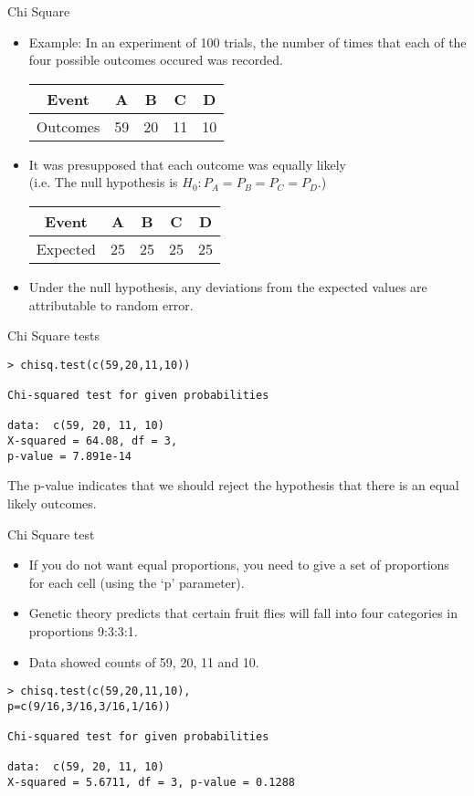 {Chi Square}
\begin{itemize}
	\item Example: In an experiment of 100 trials, the number of times that each of the four possible outcomes
	occured was recorded.\\
	\begin{tabular}{|c|c|c|c|c|}
		\hline
		Event & A & B & C & D \\\hline
		Outcomes & 59 & 20 & 11 & 10 \\
		\hline
	\end{tabular}
	
	\item It was presupposed that each outcome was equally likely \\(i.e. The null hypothesis is $H_{0} : P_{A} = P_{B} = P_{C} = P_{D}$.)\\
	\begin{tabular}{|c|c|c|c|c|}
		\hline
		Event & A & B & C & D \\\hline
		Expected & 25 & 25 & 25 & 25 \\
		\hline
	\end{tabular}
	\item Under the null hypothesis, any deviations from the expected values are attributable to random error.
	
\end{itemize}

{Chi Square tests}


\begin{verbatim}
> chisq.test(c(59,20,11,10))

Chi-squared test for given probabilities

data:  c(59, 20, 11, 10)
X-squared = 64.08, df = 3,
p-value = 7.891e-14
\end{verbatim}

The p-value indicates that we should reject the hypothesis that there is an equal likely outcomes.


{Chi Square test}
\begin{itemize}
	\item If you do not want equal proportions, you need to give a set of
	proportions for each cell (using the `p' parameter).
	\item Genetic theory predicts that certain fruit flies
	will fall into four categories in proportions 9:3:3:1.
	\item Data showed counts of 59, 20, 11 and 10.
\end{itemize}
\begin{verbatim}
> chisq.test(c(59,20,11,10),
p=c(9/16,3/16,3/16,1/16))

Chi-squared test for given probabilities

data:  c(59, 20, 11, 10)
X-squared = 5.6711, df = 3, p-value = 0.1288
\end{verbatim}

